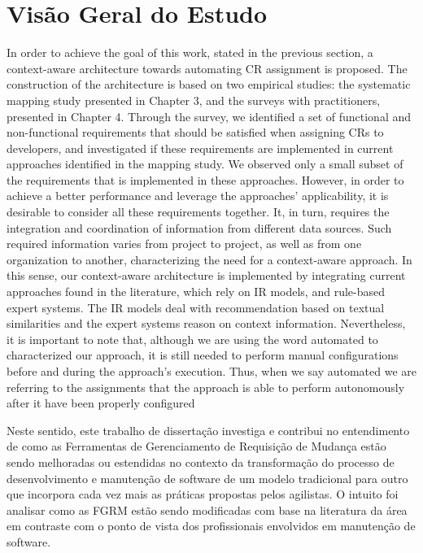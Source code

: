 \section{Visão Geral do Estudo}
\label{sec:intro-visao-geral}


In order to achieve the goal of this work, stated in the previous section, a context-aware
architecture towards automating CR assignment is proposed. The construction of the architecture is based on two empirical studies: the systematic mapping study presented in Chapter 3, and the surveys with practitioners, presented in Chapter 4. Through the survey, we identified a set of functional and non-functional requirements
that should be satisfied when assigning CRs to developers, and investigated if these requirements are implemented in current approaches identified in the mapping study. We observed only a small subset of the requirements that is implemented in these approaches. However, in order to achieve a better performance and leverage the approaches’ applicability, it is desirable to consider all these requirements together. It, in turn, requires the integration and coordination of information from different data sources. Such required information varies from project to project, as well as from one organization
to another, characterizing the need for a context-aware approach. In this sense, our context-aware architecture is implemented by integrating current approaches found in the literature, which rely on IR models, and rule-based expert systems. The IR models deal with recommendation based on textual similarities and the expert systems reason on context information. Nevertheless, it is important to note that, although we are using the word automated to
characterized our approach, it is still needed to perform manual configurations before and during the approach’s execution. Thus, when we say automated we are referring to the assignments that the approach is able to perform autonomously after it have been properly configured

Neste sentido, este trabalho de dissertação investiga e contribui no entendimento de
como as Ferramentas de Gerenciamento de Requisição de Mudança estão sendo melhoradas ou estendidas
no contexto da transformação do processo de desenvolvimento e manutenção de software de um modelo
tradicional para outro que incorpora cada vez mais as práticas propostas pelos agilistas. O intuito
foi analisar como as FGRM estão sendo modificadas com base na literatura da área em contraste com o
ponto de vista dos profissionais envolvidos em manutenção de software.

